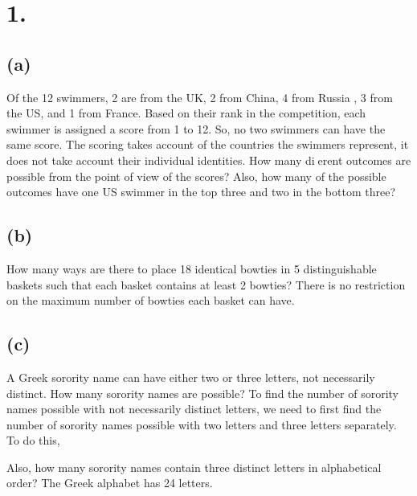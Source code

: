 \documentclass{article}
\begin{document}
\thispagestyle{firstpageheader}

\section*{1.}
{\Large 

\subsection*{(a)}
Of the 12 swimmers, 2 are from the UK, 2 from China, 4 from Russia , 3 from the US, and 1 from France.
Based on their rank in the competition, 
each swimmer is assigned a score from 1 to 12. So, no two swimmers can have the same score. The scoring
takes account of the countries the swimmers represent, it does not take account their individual identities.
How many dierent outcomes are possible from the point of view of the scores? Also, how many of the
possible outcomes have one US swimmer in the top three and two in the bottom three?



\subsection*{(b)}
How many ways are there to place 18 identical bowties in 5 distinguishable baskets such that
each basket contains at least 2 bowties? There is no restriction on the maximum number of bowties each
basket can have.



\subsection*{(c)}
A Greek sorority name can have either two or three letters, not necessarily distinct. How many
sorority names are possible? 
To find the number of sorority names possible with not necessarily distinct letters, we need to first find the number of sorority names possible with two letters and three letters separately. \\
To do this, 

Also, how many sorority names contain three distinct letters in alphabetical
order? The Greek alphabet has 24 letters.

}
\end{document}
